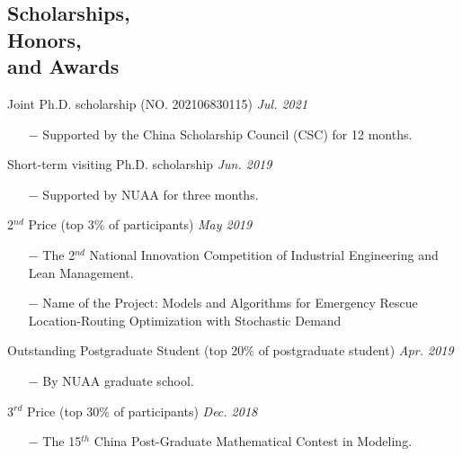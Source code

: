 \documentclass[margin]{res}
\begin{document}
\begin{resume}
\vspace{-.8em}
\section{\sc Scholarships, \\Honors, \\and Awards}


{Joint Ph.D. scholarship} (NO. 202106830115) \hfill {\it Jul. 2021}
\begin{itemize} \itemsep -2pt  %
\item[\(-\)] Supported by the China Scholarship Council (CSC) for 12 months.
\end{itemize}
\vspace{-.8em}

{Short-term visiting Ph.D. scholarship} \hfill {\it Jun. 2019}
\begin{itemize} \itemsep -2pt  %
\item[\(-\)] Supported by NUAA for three months.
\end{itemize}
\vspace{-.8em}

{2\(^{nd}\) Price} (top 3\% of participants)   \hfill {\it May 2019}
\begin{itemize} \itemsep -2pt  %
\item[\(-\)] The 2\(^{nd}\) National Innovation Competition of Industrial Engineering and Lean Management.
\item[\(-\)] Name of the Project: {Models and Algorithms for Emergency Rescue Location-Routing Optimization with Stochastic Demand}
\end{itemize}
\vspace{-.8em}

{Outstanding Postgraduate Student} (top 20\% of postgraduate student) \hfill {\it Apr. 2019}
\begin{itemize} \itemsep -2pt  %
\item[\(-\)] By NUAA graduate school.
\end{itemize}
\vspace{-.8em}

{3\(^{rd}\) Price} (top 30\% of participants)   \hfill {\it Dec. 2018}
\begin{itemize} \itemsep -2pt  %
\item[\(-\)] The 15\(^{th}\) China Post-Graduate Mathematical Contest in Modeling.
\end{itemize}
\vspace{-.8em}


\end{resume}
\end{document}
